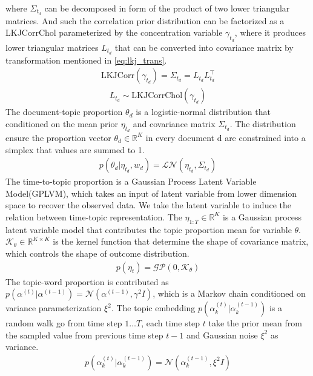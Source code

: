 where $\Sigma_{t_d}$ can be decomposed in form of the product of two lower triangular matrices. And such the correlation prior distribution can be factorized as a LKJCorrChol parameterized by the concentration variable $ \gamma_{t_d} $, where it produces lower triangular matrices $ L_{t_d} $ that can be converted into covariance matrix by transformation mentioned in \ref{eq:lkj_trans}.
\begin{align}
\text{LKJCorr}(\gamma_{t_d}) = \Sigma_{t_d} = L_{t_d}L_{t_d}^\top
\end{align}
\begin{align}
L_{t_d}\sim\text{LKJCorrChol}(\gamma_{t_d})
\end{align}
The document-topic proportion $ \theta_d $ is a logistic-normal distribution that conditioned on the mean prior $ \eta_{t_d} $ and covariance matrix $ \Sigma_{t_d} $. The distribution ensure the proportion vector $ \theta_d\in\mathbb{R}^{K} $ in every document d are constrained into a simplex that values are summed to 1. 
\begin{align}
p(\theta_d|\eta_{t_d},w_d)=\mathcal{LN}(\eta_{t_d},\Sigma_{t_d})
\end{align}
The time-to-topic proportion is a Gaussian Process Latent Variable Model(GPLVM), which takes an input of latent variable from lower dimension space to recover the observed data. We take the latent variable to induce the relation between time-topic representation. The $ \eta_{1:T}\in\mathbb{R}^{K} $ is a Gaussian process latent variable model that contributes the topic proportion mean for variable $ \theta $. $ \mathcal{K}_\theta\in\mathbb{R}^{K\times K} $ is the kernel function that determine the shape of covariance matrix, which controls the shape of outcome distribution.
\begin{align}
p(\eta_t)=\mathcal{GP}(0,\mathcal{K}_\theta)
\end{align}
The topic-word proportion is contributed as $ p(\alpha^{(t)}|\alpha^{(t-1)})=\mathcal{N}(\alpha^{(t-1)},\gamma^2I) $, which is a Markov chain conditioned on variance parameterization $ \xi^2 $. The topic embedding $ p(\alpha_k^{(t)}|\alpha_k^{(t-1)}) $ is a random walk go from time step $ 1\dots T $, each time step $ t $ take the prior mean from the sampled value from previous time step $ t-1 $ and Gaussian noise $ \xi^2 $ as variance.
\begin{align}
p(\alpha_k^{(t)}|\alpha_k^{(t-1)})=\mathcal{N}(\alpha_k^{(t-1)},\xi^2I)
\end{align}